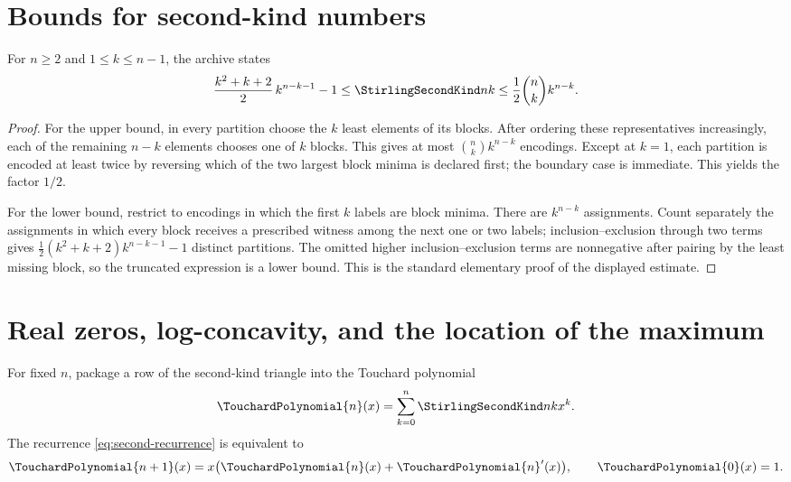 \documentclass[11pt,a4paper,oneside,openany]{book}
\theoremstyle{definition}
\theoremstyle{remark}
\begin{document}
\section{Bounds for second-kind numbers}
For $n\ge2$ and $1\le k\le n-1$, the archive states
\begin{equation}\label{eq:second-bounds}
 \frac{k^2+k+2}{2}\,k^{n-k-1}-1
 \le\StirlingSecondKind nk
 \le\frac12\binom nk k^{n-k}.
\end{equation}
\begin{proof}
For the upper bound, in every partition choose the $k$ least elements of its blocks.
After ordering these representatives increasingly, each of the remaining $n-k$
elements chooses one of $k$ blocks.  This gives at most $\binom nk k^{n-k}$ encodings.
Except at $k=1$, each partition is encoded at least twice by reversing which of the
two largest block minima is declared first; the boundary case is immediate.  This
yields the factor $1/2$.

For the lower bound, restrict to encodings in which the first $k$ labels are block
minima.  There are $k^{n-k}$ assignments.  Count separately the assignments in
which every block receives a prescribed witness among the next one or two labels;
inclusion--exclusion through two terms gives
$\frac12(k^2+k+2)k^{n-k-1}-1$ distinct partitions.  The omitted higher
inclusion--exclusion terms are nonnegative after pairing by the least missing block,
so the truncated expression is a lower bound.  This is the standard elementary
proof of the displayed estimate.
\end{proof}


\section{Real zeros, log-concavity, and the location of the maximum}
For fixed $n$, package a row of the second-kind triangle into the Touchard
polynomial
\[
 \TouchardPolynomial{n}(x)=\sum_{k=0}^{n}\StirlingSecondKind nk x^k.
\]
The recurrence \eqref{eq:second-recurrence} is equivalent to
\begin{equation}
\label{eq:touchard-differential-recurrence-shape}
 \TouchardPolynomial{n+1}(x)=x\bigl(\TouchardPolynomial{n}(x)+\TouchardPolynomial{n}'(x)\bigr),
 \qquad \TouchardPolynomial{0}(x)=1.
\end{equation}
\end{document}
